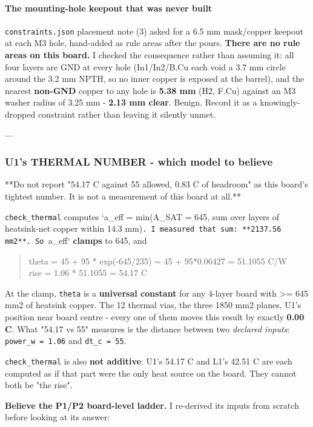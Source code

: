 \documentclass[11pt,a4paper]{article}
\begin{document}
\paragraph*{The mounting-hole keepout that was never built}
\texttt{constraints.json} placement note (3) asked for a 6.5 mm mask/copper keepout at each M3 hole, hand-added as rule areas after the pours. \textbf{There are no rule areas on this board.} I checked the consequence rather than assuming it: all four layers are GND at every hole (In1/In2/B.Cu each void a 3.7 mm circle around the 3.2 mm NPTH, so no inner copper is exposed at the barrel), and the nearest \textbf{non-GND} copper to any hole is \textbf{5.38 mm} (H2, F.Cu) against an M3 washer radius of 3.25 mm - \textbf{2.13 mm clear}. Benign. Record it as a knowingly-dropped constraint rather than leaving it silently unmet.

---

\subsubsection*{U1's THERMAL NUMBER - which model to believe}
{*}{*}Do not report "54.17 C against 55 allowed, 0.83 C of headroom" as this board's tightest number. It is not a measurement of this board at all.{*}{*}

\texttt{check\_thermal} computes `a\_eff = min(A\_SAT = 645, sum over layers of heatsink-net copper within 14.3 mm)\texttt{. I measured that sum: {*}{*}2137.56 mm2{*}{*}. So }a\_eff` \textbf{clamps} to 645, and

\begin{quote}\small\ttfamily\raggedright
theta = 45 + 95 {*} exp(-645/235) = 45 + 95{*}0.06427 = 51.1055 C/W\\
rise  = 1.06 {*} 51.1055 = 54.17 C
\end{quote}
At the clamp, \texttt{theta} is a \textbf{universal constant} for any 4-layer board with \textgreater{}= 645 mm2 of heatsink copper. The 12 thermal vias, the three 1850 mm2 planes, U1's position near board centre - every one of them moves this result by exactly \textbf{0.00 C}. What "54.17 vs 55" measures is the distance between two \emph{declared inputs}: \texttt{power\_w = 1.06} and \texttt{dt\_c = 55}.

\texttt{check\_thermal} is also \textbf{not additive}: U1's 54.17 C and L1's 42.51 C are each computed as if that part were the only heat source on the board. They cannot both be "the rise".

\textbf{Believe the P1/P2 board-level ladder.} I re-derived its inputs from scratch before looking at its answer:
\end{document}
